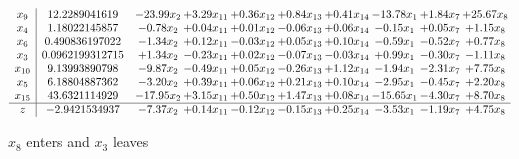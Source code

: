 \documentclass[9pt]{article}
\begin{document}
 \[\begin{array}{c| c c@{\hskip 2pt} c@{\hskip 2pt} c@{\hskip 2pt} c@{\hskip 2pt} c@{\hskip 2pt} c@{\hskip 2pt} c@{\hskip 2pt} c@{\hskip 2pt} }
 x_{9}   &  12.2289041619 & -23.99 x_{2} & +  3.29 x_{11} & +  0.36 x_{12} & +  0.84 x_{13} & +  0.41 x_{14} & -13.78 x_{1} & +  1.84 x_{7} & + 25.67 x_{8}\\
 x_{4}   &  1.18022145857 & -0.78 x_{2} & +  0.04 x_{11} & +  0.01 x_{12} & -0.06 x_{13} & +  0.06 x_{14} & -0.15 x_{1} & +  0.05 x_{7} & +  1.15 x_{8}\\
 x_{6}   &  0.490836197022 & -1.34 x_{2} & +  0.12 x_{11} & -0.03 x_{12} & +  0.05 x_{13} & +  0.10 x_{14} & -0.59 x_{1} & -0.52 x_{7} & +  0.77 x_{8}\\
 x_{3}   &  0.0962199312715 & +  1.34 x_{2} & -0.23 x_{11} & +  0.02 x_{12} & -0.07 x_{13} & -0.03 x_{14} & +  0.99 x_{1} & -0.30 x_{7} & -1.11 x_{8}\\
 x_{10}   &  9.13993890798 & -9.87 x_{2} & -0.49 x_{11} & +  0.05 x_{12} & -0.26 x_{13} & +  1.12 x_{14} & -1.94 x_{1} & -2.31 x_{7} & +  7.75 x_{8}\\
 x_{5}   &  6.18804887362 & -3.20 x_{2} & +  0.39 x_{11} & +  0.06 x_{12} & +  0.21 x_{13} & +  0.10 x_{14} & -2.95 x_{1} & -0.45 x_{7} & +  2.20 x_{8}\\
 x_{15}   &  43.6321114929 & -17.95 x_{2} & +  3.15 x_{11} & +  0.50 x_{12} & +  1.47 x_{13} & +  0.08 x_{14} & -15.65 x_{1} & -4.30 x_{7} & +  8.70 x_{8}\\
\hline
z    &  -2.9421534937 & -7.37 x_{2} & +  0.14 x_{11} & -0.12 x_{12} & -0.15 x_{13} & +  0.25 x_{14} & -3.53 x_{1} & -1.19 x_{7} & +  4.75 x_{8}\\
\end{array}\]


 $ x_{8} $ enters and $ x_{3} $ leaves 
\end{document}
